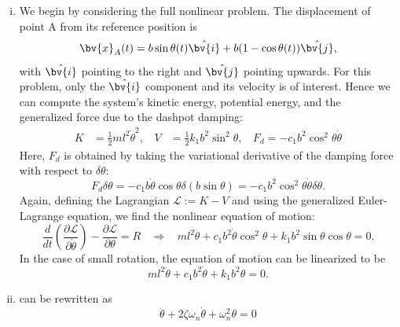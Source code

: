 \begin{enumerate}[(i)]
\item {
    We begin by considering the full nonlinear problem. The displacement of point A from its reference position is 
    \begin{equation}
        \bv{x}_A(t) = b\sin\theta(t) \hat{\bv{i}} + b(1-\cos\theta(t)) \hat{\bv{j}},
    \end{equation}
    with $\hat{\bv{i}}$ pointing to the right and $\hat{\bv{j}}$ pointing upwards.
    For this problem, only the $\hat{\bv{i}}$ component and its velocity is of interest. 
    Hence we can compute the system's kinetic energy, potential energy, and the generalized force due to the dashpot damping: 
    \begin{equation}
    \begin{aligned}
        K &= \frac{1}{2} m l^2 \dot{\theta}^2, ~~~~ V &= \frac{1}{2} k_1 b^2 \sin^2 \theta, ~~~~ F_d = -c_1 b^2 \cos^2\theta \dot{\theta}
    \end{aligned}
    \end{equation}
    Here, $F_d$ is obtained by taking the variational derivative of the damping force with respect to $\delta \theta$:
    \begin{equation}
        F_d\delta \theta = -c_1 b \dot{\theta} \cos\theta \delta \left(b \sin\theta \right) = -c_1 b^2 \cos^2 \theta \dot{\theta} \delta \theta.
    \end{equation}
    Again, defining the Lagrangian $\mathcal{L} := K - V$ and using the generalized Euler-Lagrange equation, we find the nonlinear equation of motion:
    \begin{equation}
        \frac{d}{dt} \left( \frac{\partial \mathcal{L}}{\partial \dot{\theta}} \right) - \frac{\partial \mathcal{L}}{\partial \theta} = R ~~~~ \Rightarrow ~~~~ m l^2 \ddot{\theta} + c_1 b^2 \dot{\theta} \cos^2\theta  + k_1 b^2 \sin\theta \cos\theta  = 0.
    \end{equation}
    In the case of small rotation, the equation of motion can be linearized to be 
    \begin{equation}\label{eqn:hw1_p4_linear_eqn}
        \boxed{m l^2 \ddot{\theta} + c_1 b^2 \dot{\theta} + k_1 b^2 \theta = 0}.
    \end{equation}
}
\item { %
     can be rewritten as 
    \begin{equation}
        \ddot{\theta} + 2\zeta \omega_n \dot{\theta} + \omega_n^2 \theta = 0
    \end{equation}
}
\end{enumerate}
